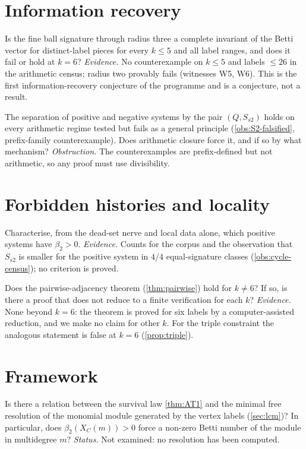 \section{Information recovery}
\begin{problem}\label{prob:radius3}
Is the fine ball signature through radius three a complete invariant of the Betti vector for distinct-label pieces for every $k\le5$ and all label ranges, and does it fail or hold at $k=6$? \emph{Evidence.} No counterexample on $k\le5$ and labels $\le26$ in the arithmetic census; radius two provably fails (witnesses W5, W6). This is the first information-recovery conjecture of the programme and is a conjecture, not a result.
\end{problem}
\begin{problem}\label{prob:arith-origin}
The separation of positive and negative systems by the pair $(Q,S_{s2})$ holds on every arithmetic regime tested but fails as a general principle (\cref{obs:S2-falsified}, prefix-family counterexample). Does arithmetic closure force it, and if so by what mechanism? \emph{Obstruction.} The counterexamples are prefix-defined but not arithmetic, so any proof must use divisibility.
\end{problem}

\section{Forbidden histories and locality}
\begin{problem}\label{prob:local-hollow}
Characterise, from the dead-set nerve and local data alone, which positive systems have $\beta_2>0$. \emph{Evidence.} Counts for the corpus and the observation that $S_{s2}$ is smaller for the positive system in $4/4$ equal-signature classes (\cref{obs:cycle-census}); no criterion is proved.
\end{problem}
\begin{problem}\label{prob:locality-k}
Does the pairwise-adjacency theorem (\cref{thm:pairwise}) hold for $k\ne6$? If so, is there a proof that does not reduce to a finite verification for each $k$? \emph{Evidence.} None beyond $k=6$: the theorem is proved for six labels by a computer-assisted reduction, and we make no claim for other $k$. For the triple constraint the analogous statement is false at $k=6$ (\cref{prop:triple}).
\end{problem}

\section{Framework}
\begin{problem}\label{prob:resolution}
Is there a relation between the survival law \cref{thm:AT1} and the minimal free resolution of the monomial module generated by the vertex labels (\cref{sec:lcm})? In particular, does $\beta_2(X_C(m))>0$ force a non-zero Betti number of the module in multidegree $m$? \emph{Status.} Not examined: no resolution has been computed.
\end{problem}
